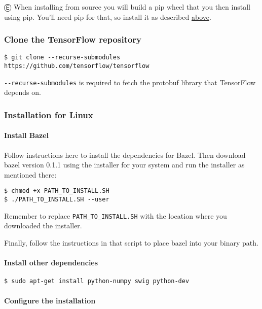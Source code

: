 Ⓔ \textcolor{etc}{When installing from source you will build a pip wheel that you then install using pip. You'll need pip for that, so install it as described \hyperref[pip_install]{above}.}

\subsubsection {Clone the TensorFlow repository}
\begin{lstlisting}
$ git clone --recurse-submodules https://github.com/tensorflow/tensorflow
\end{lstlisting}
\lstinline{--recurse-submodules} is required to fetch the protobuf library that TensorFlow depends on.


\subsubsection {Installation for Linux}

\paragraph{Install Bazel}

Follow instructions here to install the dependencies for Bazel. Then download bazel version 0.1.1 using the installer for your system and run the installer as mentioned there:

\begin{lstlisting}
$ chmod +x PATH_TO_INSTALL.SH
$ ./PATH_TO_INSTALL.SH --user
\end{lstlisting}

Remember to replace \lstinline{PATH_TO_INSTALL.SH} with the location where you downloaded the installer.

Finally, follow the instructions in that script to place bazel into your binary path.

\paragraph{Install other dependencies}

\begin{lstlisting}
$ sudo apt-get install python-numpy swig python-dev
\end{lstlisting}

\paragraph{Configure the installation}

